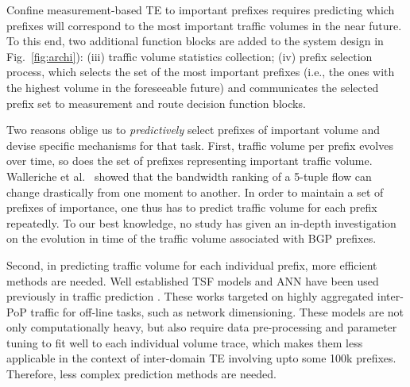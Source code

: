 Confine measurement-based TE to important prefixes requires predicting which prefixes will correspond to the most important traffic volumes in the near future.  
To this end, two additional function blocks are added to the system design in Fig.~\ref{fig:archi}): (iii) traffic volume statistics collection; (iv) prefix selection process, which selects the set of the most important prefixes (i.e., the ones with the highest volume in the foreseeable future) and communicates the selected prefix set to measurement and route decision function blocks.

Two reasons oblige us to \textit{predictively} select prefixes of important volume and devise specific mechanisms for that task.
First, traffic volume per prefix evolves over time, so does the set of prefixes representing important traffic volume. Walleriche et al.~\cite{Wallerich2006} showed that the bandwidth ranking of a 5-tuple flow can change drastically from one moment to another.
In order to maintain a set of prefixes of importance, one thus has to predict traffic volume for each prefix repeatedly.
To our best knowledge, no study has given an in-depth investigation on the evolution in time of the traffic volume associated with BGP prefixes.

Second, in predicting traffic volume for each individual prefix, more efficient methods are needed.
Well established \acf{TSF} models and \acf{ANN} have been used previously in traffic prediction \cite{Papagiannaki2005, Cortez2006, Otoshi2013}.
These works targeted on highly aggregated inter-\acf{PoP} traffic for off-line tasks, such as network dimensioning.
These models are not only computationally heavy, but also require data pre-processing and parameter tuning to fit well to each individual volume trace, which makes them less applicable in the context of inter-domain TE involving upto some 100k prefixes. Therefore, less complex prediction methods are needed. 


